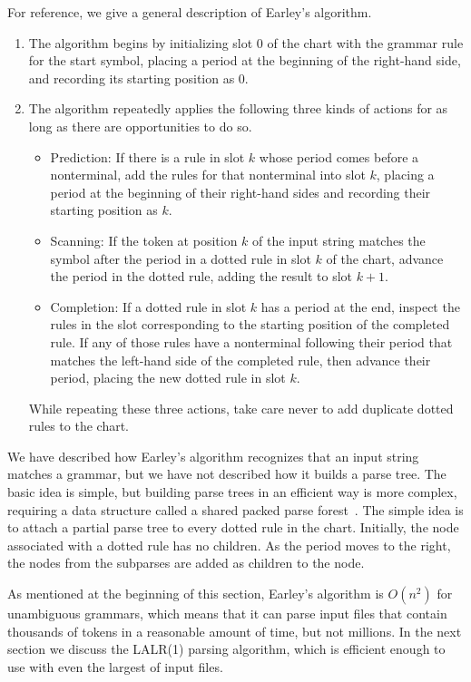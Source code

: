 \documentclass[7x10]{TimesAPriori_MIT}%
\numberwithin{theorem}{chapter}
\numberwithin{definition}{chapter}
\numberwithin{equation}{chapter}
\begin{document}
{For reference, we give a general description of Earley's
algorithm.
\begin{enumerate}
\item The algorithm begins by initializing slot $0$ of the chart with the
  grammar rule for the start symbol, placing a period at the beginning
  of the right-hand side, and recording its starting position as $0$.
  
\item The algorithm repeatedly applies the following three kinds of
  actions for as long as there are opportunities to do so.
  \begin{itemize}
  \item Prediction: If there is a rule in slot $k$ whose period comes
    before a nonterminal, add the rules for that nonterminal into slot
    $k$, placing a period at the beginning of their right-hand sides
    and recording their starting position as $k$.
  \item Scanning: If the token at position $k$ of the input string
    matches the symbol after the period in a dotted rule in slot $k$
    of the chart, advance the period in the dotted rule, adding
    the result to slot $k+1$.
  \item Completion: If a dotted rule in slot $k$ has a period at the
    end, inspect the rules in the slot corresponding to the starting
    position of the completed rule. If any of those rules have a
    nonterminal following their period that matches the left-hand side
    of the completed rule, then advance their period, placing the new
    dotted rule in slot $k$.
  \end{itemize}
  While repeating these three actions, take care never to add
  duplicate dotted rules to the chart.
\end{enumerate}

We have described how Earley's algorithm recognizes that an input
string matches a grammar, but we have not described how it builds a
parse tree. The basic idea is simple, but building parse trees in an
efficient way is more complex, requiring a data structure called a
shared packed parse forest~\citep{Tomita:1985qr}.  The simple idea is
to attach a partial parse tree to every dotted rule in the chart.
Initially, the node associated with a dotted rule has no
children. As the period moves to the right, the nodes from the
subparses are added as children to the node.

As mentioned at the beginning of this section, Earley's algorithm is
$O(n^2)$ for unambiguous grammars, which means that it can parse input
files that contain thousands of tokens in a reasonable amount of time,
but not millions.
%
In the next section we discuss the LALR(1) parsing algorithm, which is
efficient enough to use with even the largest of input files.


}
\end{document}
